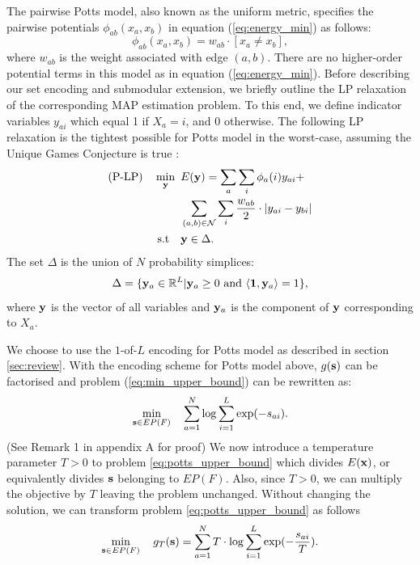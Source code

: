 \label{subsec:potts}
The pairwise Potts model, also known as the uniform metric, specifies the pairwise potentials $\phi_{ab}(x_a, x_b)$ in equation (\ref{eq:energy_min}) as follows:
\begin{equation}
    \phi_{ab}(x_a, x_b) = w_{ab} \cdot [x_a \neq x_b],
\end{equation}
where $w_{ab}$ is the weight associated with edge $(a, b)$. There are no higher-order potential terms in this model as in equation (\ref{eq:energy_min}).
%
 Before describing our set encoding and
submodular extension, we briefly outline the LP relaxation of the corresponding
MAP estimation problem. To this end, we define indicator variables $y_{ai}$
which equal 1 if $X_a = i$, and 0 otherwise. The following LP relaxation is the
tightest possible for Potts model in the worst-case, assuming the Unique Games
Conjecture is true \citep{manokaran2008sdp}:
\begin{align}
    \text{(P-LP)} \quad \min_{\bf y} \enskip & E({\bf y}) =  \sum_{a} \sum_{i} \phi_a(i)y_{ai} + \nonumber\\
     &\sum_{(a, b) \in {\mathcal N}} \sum_{i} \frac{w_{ab}}{2} \cdot |y_{ai} - y_{bi}| \nonumber\\
    \text{s.t} \quad &{\bf y} \in \Delta.
\label{eq:p-lp}
\end{align}
The set $\Delta$ is the union of $N$ probability simplices:
\begin{equation}
    \Delta = \{{\bf y}_a \in \mathbb{R}^L | {\bf y}_a \geq 0  \textrm{ and } \langle {\bf 1}, {\bf y}_a \rangle = 1\},
    \label{eq:delta}
\end{equation}
where $\bf y$ is the vector of all variables and ${\bf y}_a$ is the component
of $\bf y$ corresponding to $X_a$.


 We choose to use the $1$-of-$L$ encoding for Potts model as described in section \ref{sec:review}. With the encoding scheme for Potts model above, $g({\bf s})$ can be factorised and problem (\ref{eq:min_upper_bound}) can be rewritten as:
%
\begin{equation}
\min_{{\bf s} \in EP(F)} \quad \sum_{a = 1}^{N} \log \sum_{i = 1}^L \exp(-s_{ai}).
\label{eq:potts_upper_bound}
\end{equation}
(See Remark 1 in appendix A for proof)
 We now introduce
a temperature parameter $T > 0$ to problem \eqref{eq:potts_upper_bound} which
divides $E({\bf x})$, or equivalently divides $\bf s$ belonging to $EP(F)$. Also, since $T > 0$, we can multiply the objective by $T$ leaving the problem unchanged. Without changing the solution, we can transform problem \eqref{eq:potts_upper_bound} as follows
\begin{equation}
    \min_{{\bf s} \in EP(F)} \quad g_T ({\bf s}) = \sum_{a = 1}^{N} T \cdot \log \sum_{i = 1}^L \exp(-\frac{s_{ai}}{T}).
\label{eq:potts_temp}
\end{equation}

